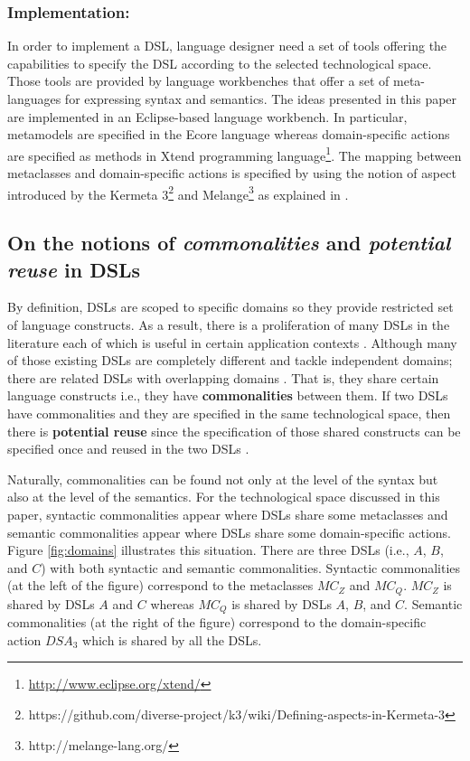 \vspace{-1mm}
\subsubsection{Implementation:} In order to implement a DSL, language designer need a set of tools offering the capabilities to specify the DSL according to the selected technological space. Those tools are provided by language workbenches that offer a set of meta-languages for expressing syntax and semantics. The ideas presented in this paper are implemented in an Eclipse-based language workbench. In particular, metamodels are specified in the Ecore language whereas domain-specific actions are specified as methods in Xtend programming language\footnote{\url{http://www.eclipse.org/xtend/}}. The mapping between metaclasses and domain-specific actions is specified by using the notion of aspect introduced by the Kermeta 3\footnote{https://github.com/diverse-project/k3/wiki/Defining-aspects-in-Kermeta-3} and Melange\footnote{http://melange-lang.org/} as explained in \cite{degueule:2015}. 

\subsection{On the notions of \textit{commonalities} and \textit{potential reuse} in DSLs}

By definition, DSLs are scoped to specific domains so they provide restricted set of language constructs. As a result, there is a proliferation of many DSLs in the literature each of which is useful in certain application contexts \cite{Mernik:2005b}. Although many of those existing DSLs are completely different and tackle independent domains; there are related DSLs with overlapping domains \cite[p. 60-61]{voelter:2013}. That is, they share certain language constructs i.e., they have \textbf{commonalities} between them. If two DSLs have commonalities and they are specified in the same technological space, then there is \textbf{potential reuse} since the specification of those shared constructs can be specified once and reused in the two DSLs \cite[p. 60-61]{voelter:2013}.

Naturally, commonalities can be found not only at the level of the syntax but also at the level of the semantics. For the technological space discussed in this paper, syntactic commonalities appear where DSLs share some metaclasses and semantic commonalities appear where DSLs share some domain-specific actions. Figure \ref{fig:domains} illustrates this situation. There are three DSLs (i.e., $A$, $B$, and $C$) with both syntactic and semantic commonalities. Syntactic commonalities (at the left of the figure) correspond to the metaclasses $MC_Z$ and $MC_Q$. $MC_Z$ is shared by DSLs $A$ and $C$ whereas $MC_Q$ is shared by DSLs $A$, $B$, and $C$. Semantic commonalities (at the right of the figure) correspond to the domain-specific action $DSA_3$ which is shared by all the DSLs. 


